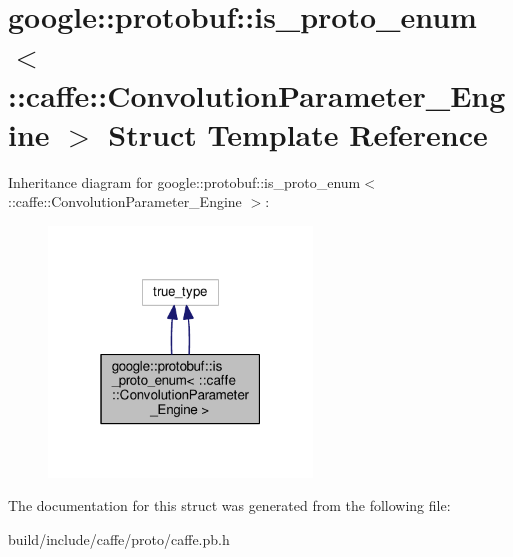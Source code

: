 \hypertarget{structgoogle_1_1protobuf_1_1is__proto__enum_3_01_1_1caffe_1_1_convolution_parameter___engine_01_4}{}\section{google\+:\+:protobuf\+:\+:is\+\_\+proto\+\_\+enum$<$ \+:\+:caffe\+:\+:Convolution\+Parameter\+\_\+\+Engine $>$ Struct Template Reference}
\label{structgoogle_1_1protobuf_1_1is__proto__enum_3_01_1_1caffe_1_1_convolution_parameter___engine_01_4}


Inheritance diagram for google\+:\+:protobuf\+:\+:is\+\_\+proto\+\_\+enum$<$ \+:\+:caffe\+:\+:Convolution\+Parameter\+\_\+\+Engine $>$\+:
\nopagebreak
\begin{figure}[H]
\begin{center}
\leavevmode
\includegraphics[width=199pt]{structgoogle_1_1protobuf_1_1is__proto__enum_3_01_1_1caffe_1_1_convolution_parameter___engine_01_4__inherit__graph}
\end{center}
\end{figure}


The documentation for this struct was generated from the following file\+:\begin{DoxyCompactItemize}
\item 
build/include/caffe/proto/caffe.\+pb.\+h\end{DoxyCompactItemize}
